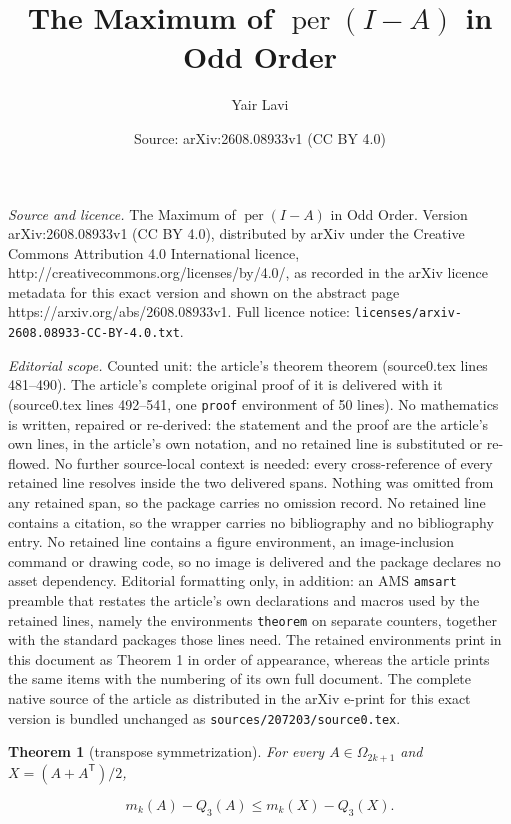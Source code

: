 \documentclass[10pt,a4paper]{amsart}
\title{The Maximum of $\operatorname{per}(I-A)$ in Odd Order}
\author{Yair Lavi}
\date{Source: arXiv:2608.08933v1 (CC BY 4.0)}
\newtheorem{theorem}{Theorem}
\begin{document}
\maketitle

\noindent\emph{Source and licence.} The Maximum of $\operatorname{per}(I-A)$ in Odd Order. Version arXiv:2608.08933v1 (CC BY 4.0), distributed by arXiv under the Creative Commons Attribution 4.0 International licence, http://creativecommons.org/licenses/by/4.0/, as recorded in the arXiv licence metadata for this exact version and shown on the abstract page https://arxiv.org/abs/2608.08933v1. Full licence notice: \texttt{licenses/arxiv-2608.08933-CC-BY-4.0.txt}.\par\smallskip

\noindent\textit{Editorial scope.} Counted unit: the article's theorem theorem (source0.tex lines 481--490). The article's complete original proof of it is delivered with it (source0.tex lines 492--541, one \texttt{proof} environment of 50 lines). No mathematics is written, repaired or re-derived: the statement and the proof are the article's own lines, in the article's own notation, and no retained line is substituted or re-flowed.  No further source-local context is needed: every cross-reference of every retained line resolves inside the two delivered spans.  Nothing was omitted from any retained span, so the package carries no omission record.  No retained line contains a citation, so the wrapper carries no bibliography and no bibliography entry.  No retained line contains a figure environment, an image-inclusion command or drawing code, so no image is delivered and the package declares no asset dependency.  Editorial formatting only, in addition: an AMS \texttt{amsart} preamble that restates the article's own declarations and macros used by the retained lines, namely the environments \texttt{theorem} on separate counters, together with the standard packages those lines need.  The retained environments print in this document as Theorem 1 in order of appearance, whereas the article prints the same items with the numbering of its own full document.  The complete native source of the article as distributed in the arXiv e-print for this exact version is bundled unchanged as \texttt{sources/207203/source0.tex}.
\begin{theorem}[transpose symmetrization]
For every
$A\in\Omega_{2k+1}$ and $X=(A+A^{\mathsf T})/2$,

\[
m_k(A)-Q_3(A)\le m_k(X)-Q_3(X).
\tag{4.10}
\]

\end{theorem}
\end{document}
